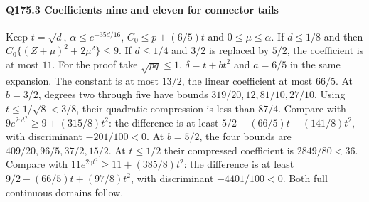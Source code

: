 \paragraph{Q175.3 Coefficients nine and eleven for connector tails}\label{part:Q175.3}
Keep $t=\allowbreak \sqrt d$, $\alpha\le\allowbreak  e^{-35d/16}$,
$C_0\le\allowbreak  p+(6/5)t$ and $0\le\allowbreak \mu\le\allowbreak \alpha$.
If $d\le\allowbreak 1/8$ and
then $C_0\{(Z+\mu)^2+2\mu^2\}\le\allowbreak 9$.
If $d\le\allowbreak 1/4$ and $3/2$ is replaced by $5/2$, the coefficient is at most
$11$. For the proof take $\sqrt{pq}\le\allowbreak 1$, $\delta=\allowbreak t+bt^2$ and
$a=\allowbreak 6/5$ in the same expansion.
The constant is at most $13/2$, the linear coefficient at most $66/5$.
At $b=\allowbreak 3/2$, degrees two through five have bounds
$319/20,\allowbreak 12,\allowbreak 81/10,\allowbreak 27/10$.
Using $t\le\allowbreak 1/\sqrt8<\allowbreak 3/8$, their quadratic compression is less than
$87/4$. Compare with $9e^{2\gamma t^2}\ge\allowbreak 9+(315/8)t^2$:
the difference is at least $5/2-(66/5)t+(141/8)t^2$, with discriminant
$-201/100<\allowbreak 0$.
At $b=\allowbreak 5/2$, the four bounds are $409/20,\allowbreak 96/5,\allowbreak 37/2,\allowbreak 15/2$.
At $t\le\allowbreak 1/2$ their compressed coefficient is $2849/80<\allowbreak 36$.
Compare with $11e^{2\gamma t^2}\ge\allowbreak 11+(385/8)t^2$:
the difference is at least $9/2-(66/5)t+(97/8)t^2$, with discriminant
$-4401/100<\allowbreak 0$. Both full continuous domains follow.

